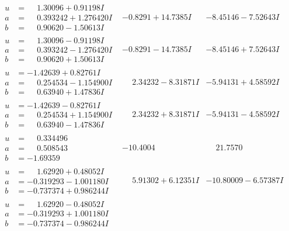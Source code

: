 \documentclass[1p]{elsarticle_modified}
\theoremstyle{definition}
\begin{document}
$$\begin{array}{c|c|c}
\begin{aligned}
u &= \phantom{-}1.30096 + 0.91198 I \\
a &= \phantom{-}0.393242 + 1.276420 I \\
b &= \phantom{-}0.90620 - 1.50613 I\end{aligned}
 & -0.8291 + 14.7385 I & -8.45146 - 7.52643 I \\ \hline\begin{aligned}
u &= \phantom{-}1.30096 - 0.91198 I \\
a &= \phantom{-}0.393242 - 1.276420 I \\
b &= \phantom{-}0.90620 + 1.50613 I\end{aligned}
 & -0.8291 - 14.7385 I & -8.45146 + 7.52643 I \\ \hline\begin{aligned}
u &= -1.42639 + 0.82761 I \\
a &= \phantom{-}0.254534 - 1.154900 I \\
b &= \phantom{-}0.63940 + 1.47836 I\end{aligned}
 & \phantom{-}2.34232 - 8.31871 I & -5.94131 + 4.58592 I \\ \hline\begin{aligned}
u &= -1.42639 - 0.82761 I \\
a &= \phantom{-}0.254534 + 1.154900 I \\
b &= \phantom{-}0.63940 - 1.47836 I\end{aligned}
 & \phantom{-}2.34232 + 8.31871 I & -5.94131 - 4.58592 I \\ \hline\begin{aligned}
u &= \phantom{-}0.334496\phantom{ +0.000000I} \\
a &= \phantom{-}0.508543\phantom{ +0.000000I} \\
b &= -1.69359\phantom{ +0.000000I}\end{aligned}
 & -10.4004\phantom{ +0.000000I} & \phantom{-}21.7570\phantom{ +0.000000I} \\ \hline\begin{aligned}
u &= \phantom{-}1.62920 + 0.48052 I \\
a &= -0.319293 - 1.001180 I \\
b &= -0.737374 + 0.986244 I\end{aligned}
 & \phantom{-}5.91302 + 6.12351 I & -10.80009 - 6.57387 I \\ \hline\begin{aligned}
u &= \phantom{-}1.62920 - 0.48052 I \\
a &= -0.319293 + 1.001180 I \\
b &= -0.737374 - 0.986244 I\end{aligned}

\end{array}$$
\end{document}
